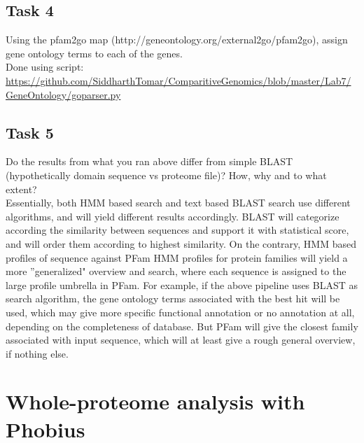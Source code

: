 \documentclass[a4paper,10pt]{article}
\begin{document}
\subsection*{Task 4}
\color{Gray}Using the pfam2go map (http://geneontology.org/external2go/pfam2go), assign gene ontology terms to each of the genes.\\
\color{black}Done using script: \\
\url{https://github.com/SiddharthTomar/ComparitiveGenomics/blob/master/Lab7/GeneOntology/goparser.py}

\subsection*{Task 5}
\color{Gray}Do the results from what you ran above differ from simple BLAST (hypothetically domain sequence vs proteome file)? How, why and to what extent?\\
\color{black}Essentially, both HMM based search and text based BLAST search use different algorithms, and will yield different results accordingly. BLAST will categorize according the similarity between sequences and support it with statistical score, and will order them according to highest similarity. On the contrary, HMM based profiles of sequence against PFam HMM profiles for protein families will yield a more ''generalized" overview and search, where each sequence is assigned to the large profile umbrella in PFam. For example, if the above pipeline uses BLAST as search algorithm, the gene ontology terms associated with the best hit will be used, which may give more specific functional annotation or no annotation at all, depending on the completeness of database. But PFam will give the closest family associated with input sequence, which will at least give a rough general overview, if nothing else.  

\section*{Whole-proteome analysis with Phobius}
\end{document}
